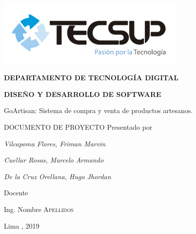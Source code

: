 \begin{titlepage}
	\centering
	\includegraphics[width=0.70\textwidth]{img/logo_tecsup_final}\par\vspace{1cm}
	\vspace{0.30cm}	
	{\scshape\large\bfseries DEPARTAMENTO DE TECNOLOG\'IA DIGITAL \par}
	\vspace{0.60cm}	
	{\scshape\large\bfseries DISEÑO Y DESARROLLO DE SOFTWARE  \par}
	\vspace{2.00cm}		
	{\large\large GoArtisan: Sistema de compra y venta de productos artesanos. \par}
	\vspace{0.60cm}
	{\scshape\large DOCUMENTO DE PROYECTO }
	\vspace{0.60cm}
	\vfill
	Presentado por \par
	{\large\itshape { Vilcapoma Flores, Friman Marvin }\par}
	{\large\itshape { Cuellar Rosas, Marcelo Armando }\par}
	{\large\itshape { De la Cruz Orellana, Hugo Jhordan }\par}
	\vspace{0.30cm}
	\vfill
	Docente \par
	Ing. Nombre  \textsc{ Apellidos}
	
  \vspace{0.30cm}
	\vfill
        {\large Lima , 2019 \par}
\end{titlepage}


